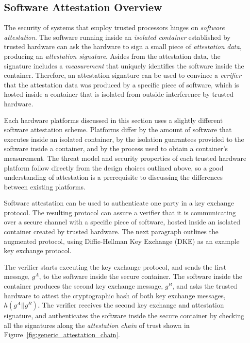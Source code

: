 \subsection{Software Attestation Overview}

The security of systems that employ trusted processors hinges on
\textit{software attestation}. The software running inside an \textit{isolated
container} established by trusted hardware can ask the hardware to sign a
small piece of \textit{attestation data}, producing an
\textit{attestation signature}. Asides from the attestation data, the signature
includes a \textit{measurement} that uniquely identifies the software inside
the container. Therefore, an attestation signature can be used to convince a
\textit{verifier} that the attestation data was produced by a specific piece
of software, which is hosted inside a container that is isolated from outside
interference by trusted hardware.

Each hardware platforms discussed in this section uses a slightly different
software attestation scheme. Platforms differ by the amount of software that
executes inside an isolated container, by the isolation guarantees provided to
the software inside a container, and by the process used to obtain a
container's measurement. The threat model and security properties of each
trusted hardware platform follow directly from the design choices outlined
above, so a good understanding of attestation is a prerequisite to discussing
the differences between existing platforms.

Software attestation can be used to authenticate one party in a key exchange
protocol. The resulting protocol can assure a verifier that it is communicating
over a secure channel with a specific piece of software, hosted inside an
isolated container created by trusted hardware. The next paragraph outlines the
augmented protocol, using Diffie-Hellman Key Exchange (DKE)
\cite{diffie1976keyexchange} as an example key exchange protocol.

The verifier starts executing the key exchange protocol, and sends the first
message, $g^{A}$, to the software inside the secure container. The software
inside the container produces the second key exchange message, $g^{B}$, and
asks the trusted hardware to attest the cryptographic hash of both key exchange
messages, $h(g^{A} || g^{B})$. The verifier receives the second key exchange
and attestation signature, and authenticates the software inside the secure
container by checking all the signatures along the \textit{attestation chain}
of trust shown in Figure~\ref{fig:generic_attestation_chain}.

